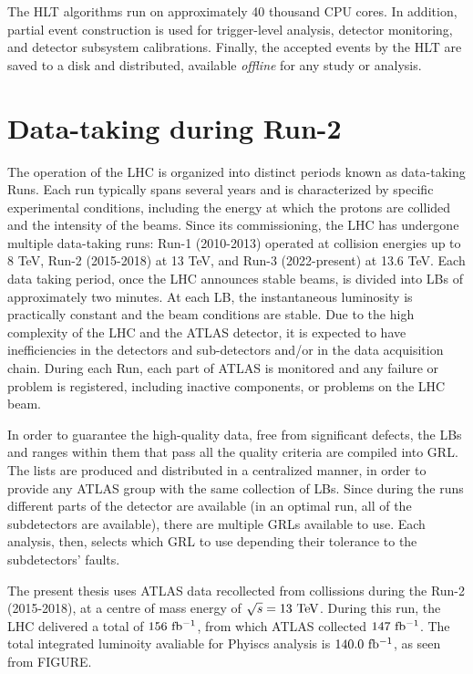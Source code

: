 The \ac{HLT} algorithms run on approximately 40 thousand CPU cores. In addition, partial event construction is used for trigger-level analysis, detector monitoring, and detector subsystem calibrations. Finally, the accepted events by the \ac{HLT} are saved to a disk and distributed, available \textit{offline} for any study or analysis.






\FloatBarrier
\section{Data-taking during Run-2}
\label{sec:atlas:run2}


The operation of the \ac{LHC} is organized into distinct periods known as data-taking Runs. Each run typically spans several years and is characterized by specific experimental conditions, including the energy at which the protons are collided and the intensity of the beams. Since its commissioning, the \ac{LHC} has undergone multiple data-taking runs: Run-1 (2010-2013) operated at collision energies up to 8 TeV, Run-2 (2015-2018) at 13 TeV, and Run-3 (2022-present) at 13.6 TeV. Each data taking period, once the \ac{LHC} announces stable beams, is divided into \acp{LB} of approximately two minutes. At each \ac{LB}, the instantaneous luminosity is practically constant and the beam conditions are stable. Due to the high complexity of the \ac{LHC} and the \ac{ATLAS} detector, it is expected to have inefficiencies in the detectors and sub-detectors and/or in the data acquisition chain. During each Run, each part of \ac{ATLAS} is monitored and any failure or problem is registered, including inactive components, or problems on the \ac{LHC} beam.

In order to guarantee the high-quality data, free from significant defects, the \acp{LB} and ranges within them that pass all the quality criteria are compiled into \ac{GRL}. The lists are produced and distributed in a centralized manner, in order to provide any \ac{ATLAS} group with the same collection of \acp{LB}. Since during the runs different parts of the detector are available (in an optimal run, all of the subdetectors are available), there are multiple \acp{GRL} available to use. Each analysis, then, selects which \ac{GRL} to use depending their tolerance to the subdetectors' faults.

The present thesis uses \ac{ATLAS} data recollected from \pp collissions during the Run-2 (2015-2018), at a centre of mass energy of \(\sqrt{s} = 13~\tev\). During this run, the \ac{LHC} delivered a total of \(156~\ifb\), from which \ac{ATLAS} collected \(147~\ifb\). The total integrated luminoity avaliable for Phyiscs analysis is \(140.0~\ifb\), as seen from FIGURE.


